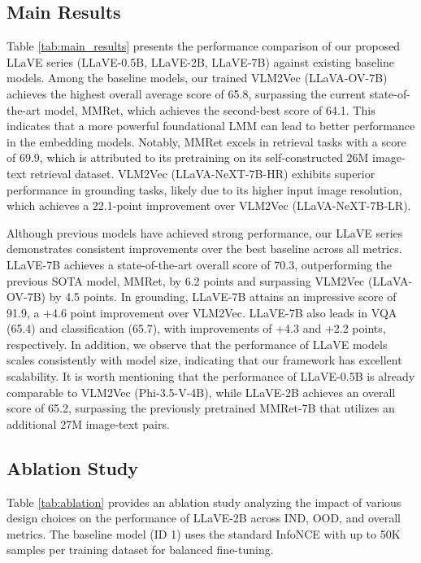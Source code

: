 \documentclass[11pt]{article}
\begin{document}
\subsection{Main Results}

Table \ref{tab:main_results} presents the performance comparison of our proposed LLaVE series (LLaVE-0.5B, LLaVE-2B, LLaVE-7B) against existing baseline models. Among the baseline models, our trained VLM2Vec (LLaVA-OV-7B) achieves the highest overall average score of 65.8, surpassing the current state-of-the-art model, MMRet, which achieves the second-best score of 64.1. This indicates that a more powerful foundational LMM can lead to better performance in the embedding models. Notably, MMRet excels in retrieval tasks with a score of 69.9, which is attributed to its pretraining on its self-constructed 26M image-text retrieval dataset. VLM2Vec (LLaVA-NeXT-7B-HR) exhibits superior performance in grounding tasks, likely due to its higher input image resolution, which achieves a 22.1-point improvement over VLM2Vec (LLaVA-NeXT-7B-LR).

Although previous models have achieved strong performance, our LLaVE series demonstrates consistent improvements over the best baseline across all metrics. LLaVE-7B achieves a state-of-the-art overall score of 70.3, outperforming the previous SOTA model, MMRet, by 6.2 points and surpassing VLM2Vec (LLaVA-OV-7B) by 4.5 points. In grounding, LLaVE-7B attains an impressive score of 91.9, a +4.6 point improvement over VLM2Vec. LLaVE-7B also leads in VQA (65.4) and classification (65.7), with improvements of +4.3 and +2.2 points, respectively. In addition, we observe that the performance of LLaVE models scales consistently with model size, indicating that our framework has excellent scalability. It is worth mentioning that the performance of LLaVE-0.5B is already comparable to VLM2Vec (Phi-3.5-V-4B), while LLaVE-2B achieves an overall score of 65.2, surpassing the previously pretrained MMRet-7B that utilizes an additional 27M image-text pairs.


\subsection{Ablation Study}
Table \ref{tab:ablation} provides an ablation study analyzing the impact of various design choices on the performance of LLaVE-2B across IND, OOD, and overall metrics. The baseline model (ID 1) uses the standard InfoNCE with up to 50K samples per training dataset for balanced fine-tuning.
\end{document}
